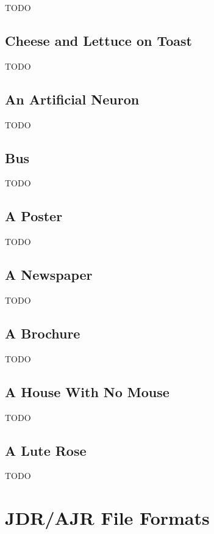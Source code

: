 TODO


\section{Cheese and Lettuce on Toast}\label{sec:cheeseexample}

TODO


\section{An Artificial Neuron}\label{sec:neuronexample}

TODO


\section{Bus}\label{sec:busexample}

TODO


\section{A Poster}\label{sec:postertutorial}

TODO


\section{A Newspaper}\label{sec:newstutorial}

TODO


\section{A Brochure}\label{sec:brochure}

TODO


\section{A House With No Mouse}\label{sec:accesstutorial}

TODO


\section{A Lute Rose}\label{sec:rosetutorial}

TODO


\chapter{JDR/AJR File Formats}\label{sec:jdrajrformat}

